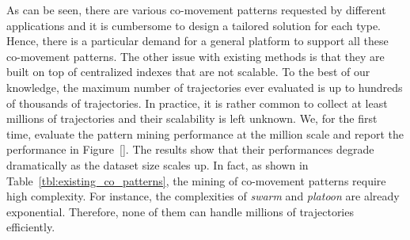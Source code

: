 



As can be seen, there are various co-movement patterns requested by different applications and it is cumbersome to design a tailored solution for each type. Hence, there is a particular demand for a general platform to support all these co-movement patterns. The other issue with existing methods is that they are built on top of centralized indexes that are not scalable. To the best of our knowledge, the maximum number of trajectories ever evaluated is up to hundreds of thousands of trajectories. In practice, it is rather common to collect at least millions of trajectories and their scalability is left unknown. We, for the first time, evaluate the pattern mining performance at the million scale and report the performance in Figure~\ref{}. The results show that their performances degrade dramatically as the dataset size scales up. In fact, as shown in Table~\ref{tbl:existing_co_patterns}, the mining of co-movement patterns require high complexity. For instance, the
complexities of \emph{swarm} and \emph{platoon} are already exponential. 
Therefore, none of them can handle millions of trajectories efficiently. 

